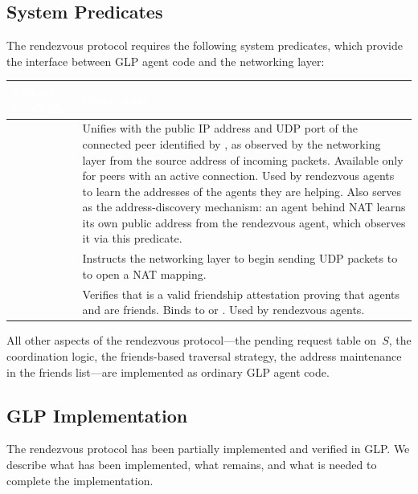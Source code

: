 \subsection{System Predicates}
\label{sec:rv-predicates}
The rendezvous protocol requires the following system predicates, which provide the interface between GLP agent code and the networking layer:

\begin{longtable}{L{4cm} L{9.5cm}}
\toprule
{}
\textcolor{white}{\textbf{System Predicate}} &
\textcolor{white}{\textbf{Description}} \\
\midrule
\endhead
{} & Unifies  with the public IP address and UDP port of the connected peer identified by , as observed by the networking layer from the source address of incoming packets.  Available only for peers with an active connection.  Used by rendezvous agents to learn the addresses of the agents they are helping.  Also serves as the address-discovery mechanism: an agent behind NAT learns its own public address from the rendezvous agent, which observes it via this predicate. \\
 & Instructs the networking layer to begin sending UDP packets to  to open a NAT mapping. \\
 & Verifies that  is a valid friendship attestation proving that agents  and  are friends.  Binds  to  or .  Used by rendezvous agents. \\
\bottomrule
\end{longtable}

All other aspects of the rendezvous protocol---the pending request table on~$S$, the coordination logic, the friends-based traversal strategy, the address maintenance in the friends list---are implemented as ordinary GLP agent code.

\subsection{GLP Implementation}
\label{sec:rv-glp-impl}
The rendezvous protocol has been partially implemented and verified in GLP.  We describe what has been implemented, what remains, and what is needed to complete the implementation.

